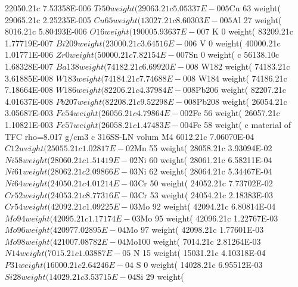 \begin{python}
22050.21c 7.53358E-006 $Ti 50 weight(%
29063.21c 5.05337E-005 $Cu 63 weight(%
29065.21c 2.25235E-005 $Cu 65 weight(%
13027.21c 8.60303E-005 $Al 27 weight(%
8016.21c 5.80493E-006 $ O 16 weight(%
19000 5.93637E-007 $ K  0 weight(%
83209.21c 1.77719E-007 $Bi209 weight(%
23000.21c 3.64516E-006 $ V  0 weight(%
40000.21c 1.01771E-006 $Zr  0 weight(%
50000.21c 7.82154E-007 $Sn  0 weight(%
c    56138.10c 1.68328E-007 $Ba138 weight(%
74182.21c 6.69920E-008 $ W182 weight(%
74183.21c 3.61885E-008 $ W183 weight(%
74184.21c 7.74688E-008 $ W184 weight(%
74186.21c 7.18664E-008 $ W186 weight(%
82206.21c 4.37984E-008 $Pb206 weight(%
82207.21c 4.01637E-008 $Pb207 weight(%
82208.21c 9.52298E-008 $Pb208 weight(%
26054.21c 3.05687E-003 $Fe 54 weight(%
26056.21c 4.79864E-002 $Fe 56 weight(%
26057.21c 1.10821E-003 $Fe 57 weight(%
26058.21c 1.47483E-004 $Fe 58 weight(%
c material of TFC rho=8.017 g/cm3
c 316SS-LN volum%
M4 6012.21c    7.06070E-04 $ C 12 weight(%
25055.21c 1.02817E-02 $Mn 55 weight(%
28058.21c 3.93094E-02 $Ni 58 weight(%
28060.21c 1.51419E-02 $Ni 60 weight(%
28061.21c 6.58211E-04 $Ni 61 weight(%
28062.21c 2.09866E-03 $Ni 62 weight(%
28064.21c 5.34467E-04 $Ni 64 weight(%
24050.21c 4.01214E-03 $Cr 50 weight(%
24052.21c 7.73702E-02 $Cr 52 weight(%
24053.21c 8.77316E-03 $Cr 53 weight(%
24054.21c 2.18383E-03 $Cr 54 weight(%
42092.21c 1.09225E-03 $Mo 92 weight(%
42094.21c 6.80814E-04 $Mo 94 weight(%
42095.21c 1.17174E-03 $Mo 95 weight(%
42096.21c 1.22767E-03 $Mo 96 weight(%
42097 7.02895E-04 $Mo 97 weight(%
42098.21c 1.77601E-03 $Mo 98 weight(%
42100 7.08782E-04 $Mo100 weight(%
7014.21c 2.81264E-03 $ N 14 weight(%
7015.21c 1.03887E-05 $ N 15 weight(%
15031.21c 4.10318E-04 $ P 31 weight(%
16000.21c 2.64246E-04 $ S  0 weight(%
14028.21c 6.95512E-03 $Si 28 weight(%
14029.21c 3.53715E-04 $Si 29 weight(%

\end{python}
